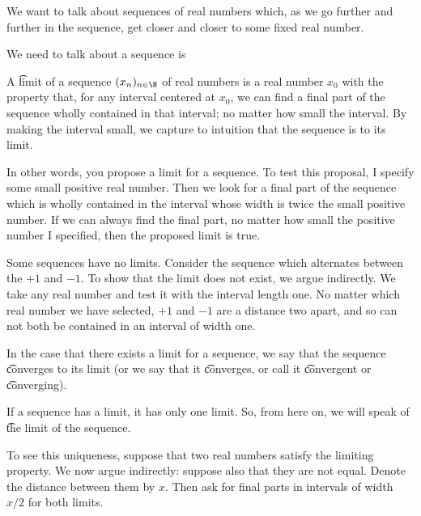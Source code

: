 

We want to talk about sequences of real numbers which, as we go further and further in the sequence, get closer and closer to some fixed real number.


We need to talk about  a sequence is 

A \t{limit} of a sequence $(x_n)_{n \in \N}$ of real numbers is a real number $x_0$ with the property that, for any interval centered at $x_0$, we can find a final part of the sequence wholly contained in that interval; no matter how small the interval.
By making the interval small, we capture to intuition that the sequence is  to its limit.

In other words, you propose a limit for a sequence.
To test this proposal, I specify some small positive real number.
Then we look for a final part of the sequence which is wholly contained in the interval whose width is twice the small positive number.
If we can always find the final part, no matter how small the positive number I specified, then the proposed limit is true.


Some sequences have no
limits.
Consider the sequence
which alternates between
the $+1$
and $-1$.
To show that the limit
does not exist, we
argue indirectly.
We take any real
number and test it
with the interval length
one.
No matter which
real number we have
selected,
$+1$ and
$-1$ are a
distance two apart,
and so can not
both be contained
in an interval
of width one.

In the case that there exists a limit for a sequence, we say that the sequence \t{converges to} its limit (or we say that it \t{converges}, or call it \t{convergent} or \t{converging}).


If a sequence has a limit,
it has only one limit.
So, from here on, we will speak
of \t{the limit} of
the sequence.

To see this uniqueness,
suppose that two
real numbers satisfy the
limiting property.
We now argue indirectly:
suppose also that they are
not equal.
Denote the distance between
them by $x$.
Then ask for final parts
in intervals of width $x/2$
for both limits.


